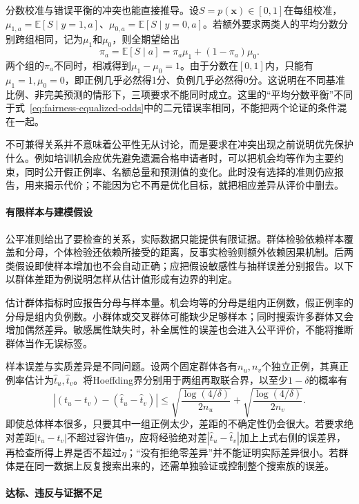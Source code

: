 分数校准与错误平衡的冲突也能直接推导。设$S=p(\bm{x})\in[0,1]$在每组校准，$\mu_{1,a}=\mathbb E[S\mid y=1,a]$、$\mu_{0,a}=\mathbb E[S\mid y=0,a]$。若额外要求两类人的平均分数分别跨组相同，记为$\mu_1$和$\mu_0$，则全期望给出
\[
 \pi_a=\mathbb E[S\mid a]
       =\pi_a\mu_1+(1-\pi_a)\mu_0.
\]
两个组的$\pi_a$不同时，相减得到$\mu_1-\mu_0=1$。由于分数在$[0,1]$内，只能有$\mu_1=1,\mu_0=0$，即正例几乎必然得1分、负例几乎必然得0分。这说明在不同基准比例、非完美预测的情形下，三项要求不能同时成立。这里的“平均分数平衡”不同于式~\eqref{eq:fairness-equalized-odds}中的二元错误率相同，不能把两个论证的条件混在一起。

不可兼得关系并不意味着公平性无从讨论，而是要求在冲突出现之前说明优先保护什么。例如培训机会应优先避免遗漏合格申请者时，可以把机会均等作为主要约束，同时公开假正例率、名额总量和预测值的变化。此时没有选择的准则仍应报告，用来揭示代价；不能因为它不再是优化目标，就把相应差异从评价中删去。

\paragraph{有限样本与建模假设}

公平准则给出了要检查的关系，实际数据只能提供有限证据。群体检验依赖样本覆盖和分母，个体检验还依赖所接受的距离，反事实检验则额外依赖因果机制。后两类假设即使样本增加也不会自动正确；应把假设敏感性与抽样误差分别报告。以下以群体差距为例说明怎样从估计值形成有边界的判定。

估计群体指标时应报告分母与样本量。机会均等的分母是组内正例数，假正例率的分母是组内负例数。小群体或交叉群体可能缺少足够样本；同时搜索许多群体又会增加偶然差异。敏感属性缺失时，补全属性的误差也会进入公平评价，不能将推断群体当作无误标签。

样本误差与实质差异是不同问题。设两个固定群体各有$n_u,n_v$个独立正例，其真正例率估计为$\hat t_u,\hat t_v$。将Hoeffding界分别用于两组再取联合界，以至少$1-\delta$的概率有
\[
 |(t_u-t_v)-(\hat t_u-\hat t_v)|
 \leq
 \sqrt{\frac{\log(4/\delta)}{2n_u}}
 +\sqrt{\frac{\log(4/\delta)}{2n_v}}.
\]
即使总体样本很多，只要其中一组正例太少，差距的不确定性仍会很大。若要求绝对差距$|t_u-t_v|$不超过容许值$\eta$，应将经验绝对差$|\hat t_u-\hat t_v|$加上上式右侧的误差界，再检查所得上界是否不超过$\eta$；“没有拒绝零差异”并不能证明实际差异很小。若群体是在同一数据上反复搜索出来的，还需单独验证或控制整个搜索族的误差。

\paragraph{达标、违反与证据不足}

